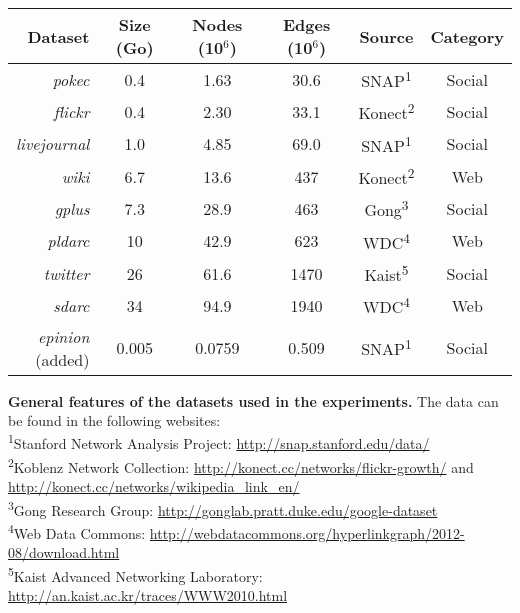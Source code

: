 \centering
\begin{tabular}{r||c|c|c|c|c}
  Dataset & Size (Go) & Nodes (10$^6$) & Edges  (10$^6$) & Source & Category\\
  \hline%
  \textit{pokec} & 0.4 & 1.63 & 30.6 & SNAP\textsuperscript{1} & Social \\
  \textit{flickr} & 0.4 & 2.30 & 33.1 & Konect\textsuperscript{2} & Social \\
  \textit{livejournal} & 1.0 & 4.85 & 69.0 & SNAP\textsuperscript{1} & Social \\
  \textit{wiki} & 6.7 & 13.6 & 437 & Konect\textsuperscript{2} & Web \\
  \textit{gplus} & 7.3 & 28.9 & 463 & Gong\textsuperscript{3} & Social \\
  \textit{pldarc} & 10 & 42.9 & 623 & WDC\textsuperscript{4} & Web\\
  \textit{twitter} & 26 & 61.6 & 1470 & Kaist\textsuperscript{5} & Social\\
  \textit{sdarc} & 34 & 94.9 & 1940 & WDC\textsuperscript{4} & Web \\
  \hline
  \parbox{1.6cm}{\hfill \textit{epinion}\\\null\hfill (added)} & 0.005 & 0.0759 & 0.509 & SNAP\textsuperscript{1} & Social \\
\end{tabular}
\caption{\textbf{General features of the datasets used in the experiments.} The data can be found in the following websites:\\
 \footnotesize{
   \textsuperscript{1}Stanford Network Analysis Project: \url{http://snap.stanford.edu/data/}\\
   \textsuperscript{2}Koblenz Network Collection: \url{http://konect.cc/networks/flickr-growth/} and \url{http://konect.cc/networks/wikipedia_link_en/}\\
   \textsuperscript{3}Gong Research Group: \url{http://gonglab.pratt.duke.edu/google-dataset}\\
   \textsuperscript{4}Web Data Commons: \url{http://webdatacommons.org/hyperlinkgraph/2012-08/download.html}\\
   \textsuperscript{5}Kaist Advanced Networking Laboratory: \url{http://an.kaist.ac.kr/traces/WWW2010.html}
 }
}
